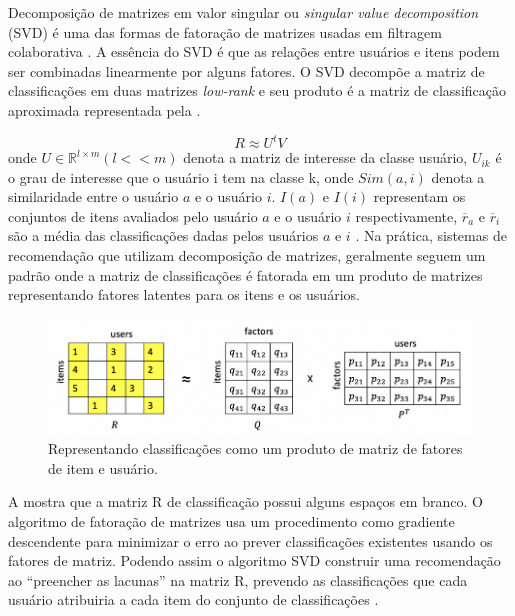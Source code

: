\documentclass[portuguese]{textolivre}
\begin{document}
Decomposição de matrizes em valor singular ou \textit{singular value decomposition} (SVD) é uma das formas de fatoração de matrizes usadas em filtragem
colaborativa \cite{zhang2005using}. A essência do SVD é que as relações entre usuários e itens podem ser combinadas linearmente por alguns fatores. O SVD decompõe a matriz de classificações em duas matrizes \textit{low-rank} e seu produto é a matriz de classificação aproximada representada pela .

\begin{equation}
\label{eq-svd}
 R \approx {U}^t V
\end{equation}
onde \(U \in {\mathbb{R}}^{l \times m} ( l << m)\) denota a  matriz de interesse da classe usuário,  \(U_{ik}\) é o grau de interesse que o usuário i tem na classe k, onde \(Sim(a,i)\) denota a similaridade entre o usuário \(a\) e o usuário \(i\). \(I(a)\) e \(I(i)\) representam os conjuntos de itens avaliados pelo usuário \(a\) e o usuário \(i\) respectivamente, \(\overline{r}_{a}\) e \(\overline{r}_{i}\) são a média das classificações dadas pelos usuários \(a\) e \(i\) \cite{yuan2019singular}. Na prática, sistemas de recomendação que utilizam decomposição de matrizes, geralmente seguem um padrão onde a matriz de classificações é fatorada em um produto de matrizes representando fatores latentes para os itens e os usuários.

\begin{figure}[htbp]
\centering
\begin{minipage}{.8\textwidth}
\includegraphics[width=\textwidth]{imagens/fig-002.png}
\caption{Representando classificações como um produto de matriz de fatores de item e usuário.}
 \label{fig-img-002}
\end{minipage}
\end{figure}

A  mostra que a matriz R de classificação possui alguns espaços em branco. O algoritmo de fatoração de matrizes usa um procedimento como gradiente descendente para minimizar o erro ao prever classificações existentes usando os fatores de matriz. Podendo assim o algoritmo SVD construir uma recomendação ao “preencher as lacunas” na matriz R, prevendo as classificações que cada usuário atribuiria a cada item do conjunto de classificações \cite{RecommenderSVD}.
\end{document}
